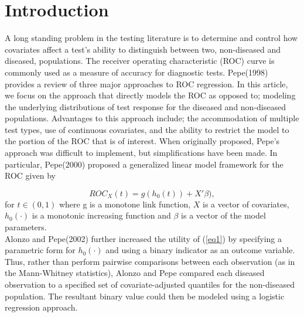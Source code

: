 \documentclass{interact}
\theoremstyle{definition}
\begin{document}
\section{Introduction}

A long standing problem in the testing literature is to determine and control how  covariates affect a test's ability to distinguish between two,  non-diseased and diseased,  populations.  The receiver operating characteristic (ROC) curve is commonly used as a  measure of accuracy for diagnostic tests.
Pepe(1998) provides a review of three major  approaches to ROC regression. In this article, we focus on the approach %
that directly models the ROC as opposed to;  modeling the underlying distributions of test response for the diseased and non-diseased populations.  Advantages to this approach include; the accommodation of multiple test types, use of continuous covariates, and the ability to restrict the model to the portion of the ROC that is of interest.  When originally proposed, Pepe's approach was difficult to implement, but simplifications have been made.  In particular, Pepe(2000) proposed a generalized linear model framework for the ROC given by 

\begin{equation}\label{eq1} ROC_X(t) = g(h_0(t)) + X'\beta),\end{equation} 
for $ t \in (0,1)$ where g is a monotone link function, $X$ is a vector of covariates, $h_0(\cdot)$ is a monotonic increasing function and $\beta$ is a vector of the model parameters.\\ %

 Alonzo and Pepe(2002) further increased the utility of (\ref{eq1}) by specifying a parametric form for $h_0(\cdot)$ and using a binary indicator as an outcome variable.  Thus, rather than perform pairwise comparisons between each observation (as in the Mann-Whitney statistics), Alonzo and Pepe compared each diseased observation to a specified set of covariate-adjusted quantiles for the non-diseased population. The resultant binary value could then be modeled using  a logistic regression approach. 
\end{document}

